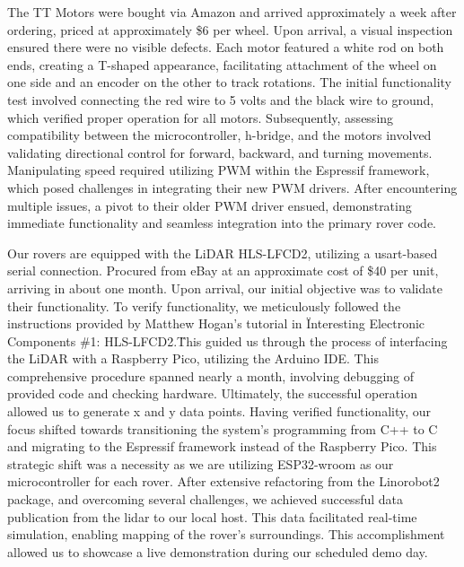 \documentclass[conference]{IEEEtran}
\begin{document}
The TT Motors were bought via Amazon and arrived approximately a week after ordering, priced at approximately \$6 per wheel. Upon arrival, a visual inspection ensured there were no visible defects. Each motor featured a white rod on both ends, creating a T-shaped appearance, facilitating attachment of the wheel on one side and an encoder on the other to track rotations.
The initial functionality test involved connecting the red wire to 5 volts and the black wire to ground, which verified proper operation for all motors. Subsequently, assessing compatibility between the microcontroller, h-bridge, and the motors involved validating directional control for forward, backward, and turning movements. Manipulating speed required utilizing PWM within the Espressif framework, which posed challenges in integrating their new PWM drivers. After encountering multiple issues, a pivot to their older PWM driver ensued, demonstrating immediate functionality and seamless integration into the primary rover code.


Our rovers are equipped with the LiDAR HLS-LFCD2, utilizing a usart-based serial connection. Procured from eBay at an approximate cost of \$40 per unit, arriving in about one month. Upon arrival, our initial objective was to validate their functionality.
To verify functionality, we meticulously followed the instructions provided by Matthew Hogan's tutorial in \"Interesting Electronic Components \#1: HLS-LFCD2.\" This guided us through the process of interfacing the LiDAR with a Raspberry Pico, utilizing the Arduino IDE. This comprehensive procedure spanned nearly a month, involving debugging of provided code and checking hardware. Ultimately, the successful operation allowed us to generate x and y data points.
Having verified functionality, our focus shifted towards transitioning the system's programming from C++ to C and migrating to the Espressif framework instead of the Raspberry Pico. This strategic shift was a necessity as we are utilizing ESP32-wroom as our microcontroller for each rover.
After extensive refactoring from the Linorobot2 package, and overcoming several challenges, we achieved successful data publication from the lidar to our local host. This data facilitated real-time simulation, enabling mapping of the rover's surroundings. This accomplishment allowed us to showcase a live demonstration during our scheduled demo day.
\end{document}

